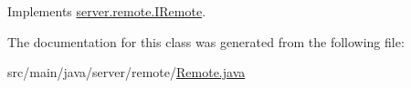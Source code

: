 Implements \hyperlink{interfaceserver_1_1remote_1_1_i_remote_ac8a764235c51eff20d635f40707e377e}{server.\+remote.\+I\+Remote}.



The documentation for this class was generated from the following file\+:\begin{DoxyCompactItemize}
\item 
src/main/java/server/remote/\hyperlink{_remote_8java}{Remote.\+java}\end{DoxyCompactItemize}
